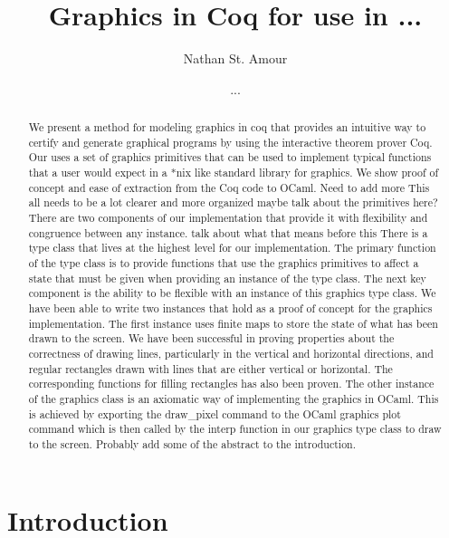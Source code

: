 \documentclass{llncs}
\begin{document}
\title{Graphics in Coq for use in ...}
\author{Nathan St. Amour \and ...}


\maketitle

\begin{abstract}

We present a method for modeling graphics in coq that provides an intuitive way to certify and generate graphical programs by using the interactive
theorem prover Coq.  Our uses a set of graphics primitives that can be used to implement typical functions that a user would expect in a *nix like
standard library for graphics.  We show proof of concept and ease of extraction from the Coq code to OCaml. {\color{red} Need to add more}
{\color{red} This all needs to be a lot clearer and more organized maybe talk about the primitives here?} There are two components of our implementation that provide it with flexibility and congruence between any instance. {\color{red}talk about what that means before this} There is a type class that lives at the highest level for our implementation.  The primary function of the type class is to provide functions that use the graphics
primitives to affect a state that must be given when providing an instance of the type class. The next key component is the ability to be flexible with an instance of this graphics type class.  We have been able to write two instances that hold as a proof of concept for the graphics implementation.  The first instance uses finite maps to store the state of what has been drawn to the screen.  We have been successful in proving properties
about the correctness of drawing lines, particularly in the vertical and horizontal directions, and regular rectangles drawn with lines that are
either vertical or horizontal.  The corresponding functions for filling rectangles has also been proven.  The other instance of the graphics class is an axiomatic way of implementing the graphics in OCaml.  This is achieved by exporting the draw\_pixel command to the OCaml graphics plot command which is then called by the interp function in our graphics type class to draw to the screen.  {\color{red}Probably add some of the abstract
  to the introduction.}
\end{abstract}



\section{Introduction}
\end{document}
